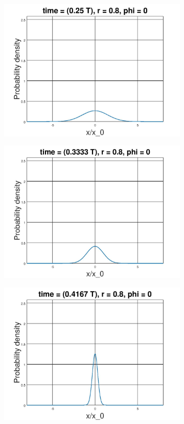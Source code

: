 \documentclass[12pt, twoside]{article}
\begin{document}
\begin{figure}[h!]
\begin{subfigure}[h!]{0.3\linewidth}
		\includegraphics[width=\linewidth]{graphs/squeezed_vacuum/3.jpg}
	\end{subfigure}
	\begin{subfigure}[h!]{0.3\linewidth}
		\includegraphics[width=\linewidth]{graphs/squeezed_vacuum/4.jpg}
	\end{subfigure}
	\begin{subfigure}[h!]{0.3\linewidth}
		\includegraphics[width=\linewidth]{graphs/squeezed_vacuum/5.jpg}

\end{subfigure}
\end{figure}
\end{document}
